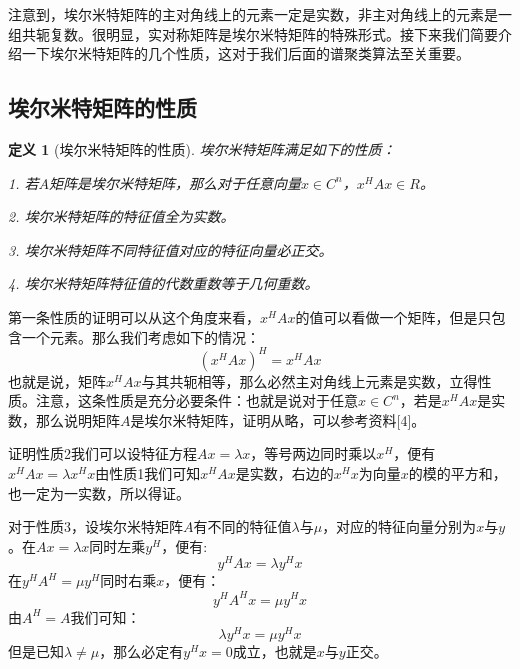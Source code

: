 \documentclass[UTF8, 12pt]{ctexart}
\newtheorem{thm}{定义}
\begin{document}
注意到，埃尔米特矩阵的主对角线上的元素一定是实数，非主对角线上的元素是一组共轭复数。很明显，实对称矩阵是埃尔米特矩阵的特殊形式。接下来我们简要介绍一下埃尔米特矩阵的几个性质，这对于我们后面的谱聚类算法至关重要。


\subsection{埃尔米特矩阵的性质}
\begin{thm}[埃尔米特矩阵的性质]埃尔米特矩阵满足如下的性质：
	
	1. 若$A$矩阵是埃尔米特矩阵，那么对于任意向量$x \in C^n$，${x^H}A{x} \in R$。
	
	2. 埃尔米特矩阵的特征值全为实数。
	
	3. 埃尔米特矩阵不同特征值对应的特征向量必正交。
	
	4. 埃尔米特矩阵特征值的代数重数等于几何重数。
\end{thm}

第一条性质的证明可以从这个角度来看，${x^H}A{x}$的值可以看做一个矩阵，但是只包含一个元素。那么我们考虑如下的情况：
\begin{equation}
({x^H}A{x})^H = {x^H}A{x}
\end{equation}
也就是说，矩阵${x^H}A{x}$与其共轭相等，那么必然主对角线上元素是实数，立得性质。注意，这条性质是充分必要条件：也就是说对于任意$x \in C^n$，若是${x^H}A{x}$是实数，那么说明矩阵$A$是埃尔米特矩阵，证明从略，可以参考资料[4]。

证明性质2我们可以设特征方程$Ax = \lambda x$，等号两边同时乘以$x^H$，便有${x^H}A{x}=\lambda {x^H}x$由性质1我们可知${x^H}A{x}$是实数，右边的${x^H}{x}$为向量$x$的模的平方和，也一定为一实数，所以得证。

对于性质3，设埃尔米特矩阵$A$有不同的特征值$\lambda$与$\mu$，对应的特征向量分别为$x$与$y$。在$Ax=\lambda x$同时左乘$y^H$，便有:
\begin{equation}
{y^H}A{x}= \lambda {y^H}x
\end{equation}
在${y^H}{A^H}=\mu {y^H}$同时右乘$x$，便有：
\begin{equation}
{y^H}{A^H}x = \mu {y^H}	x
\end{equation}
由${A^H} = A$我们可知：
\begin{equation}
\lambda {y^H}x = \mu {y^H}x
\end{equation}
但是已知$\lambda \ne \mu$，那么必定有${y^H}x=0$成立，也就是$x$与$y$正交。
\end{document}
